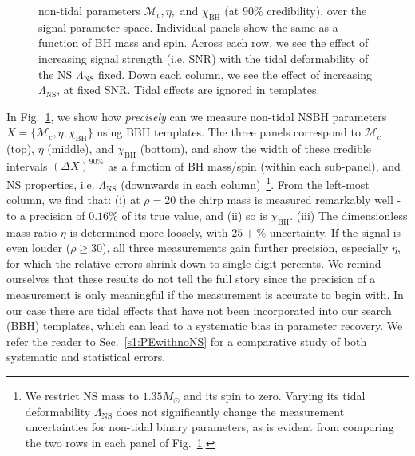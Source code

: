 \documentclass[aps,prd,amsmath,floats,floatfix, twocolumn,
superscriptaddress,nofootinbib,showpacs]{revtex4-1}
\newcommand{\lambdans}{\Lambda_\mathrm{NS}}
\newcommand{\chibh}{\chi_\mathrm{BH}}
\newcommand{\mchirp}{\mathcal{M}_c}
\begin{document}
\begin{appendix}
\begin{figure}
{non-tidal parameters $\mchirp, \eta,$ and $\chibh$ (at $90\%$ credibility),
over the signal parameter space. Individual panels show the same as a function
of BH mass and spin. Across each row, we see the effect of increasing signal
strength (i.e. SNR) with the tidal deformability of the NS $\lambdans$ fixed.
Down each column, we see the effect of increasing $\lambdans$, at fixed SNR.
Tidal effects are ignored in templates.
}
\label{fig:CIWidths90_Lambda_SNR}
\end{figure}
In Fig.~\ref{fig:CIWidths90_Lambda_SNR}, we show how {\it precisely} can we
measure non-tidal NSBH parameters $X=\{\mchirp,\eta,\chibh\}$ using BBH templates.
The three panels correspond to $\mchirp$ (top), $\eta$ (middle), and $\chibh$
(bottom), and show the width of these credible intervals $(\Delta X)^{90\%}$
as a function of BH mass/spin (within each sub-panel), and NS properties, i.e.
$\lambdans$ (downwards in each column)~\footnote{We restrict NS mass to
$1.35M_\odot$ and its spin to zero. Varying its tidal deformability $\lambdans$
does not significantly change the measurement uncertainties for non-tidal
binary parameters, as is evident from comparing the two rows in each panel of
Fig.~\ref{fig:CIWidths90_Lambda_SNR}.}.
% 
From the left-most column, we find that: (i) at $\rho=20$ the chirp mass is
measured remarkably well - to a precision of $0.16\%$ of its true value, and
(ii) so is $\chibh$. (iii) The dimensionless mass-ratio $\eta$ is determined
more loosely, with $25+\%$ uncertainty. If the signal is even louder
($\rho\geq 30$), all three measurements gain further precision, especially
$\eta$, for which the relative errors shrink down to single-digit percents.
We remind ourselves that these results do not tell the full story since the
precision of a measurement is only meaningful if the measurement is accurate 
to begin with. In our case there are tidal effects that have not been
incorporated into our search (BBH) templates, which can lead to a systematic
bias in parameter recovery. We refer the reader to Sec.~\ref{s1:PEwithnoNS} for
a comparative study of both systematic and statistical errors.





\end{appendix}
\end{document}
